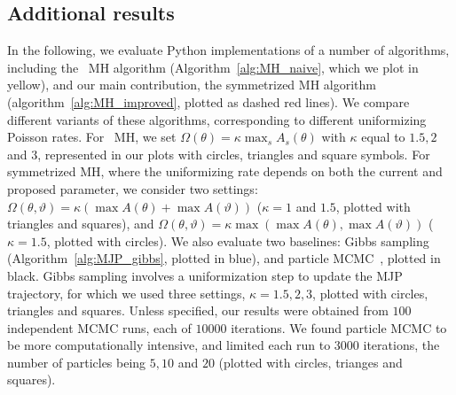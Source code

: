 \subsection{Additional results}
In the following, we evaluate Python implementations of a number of algorithms, including the \naive\ MH algorithm (Algorithm~\ref{alg:MH_naive}, which we plot in yellow), and our main contribution, the symmetrized MH algorithm (algorithm~\ref{alg:MH_improved}, plotted as dashed red lines). 
We compare different variants of these algorithms, corresponding to different uniformizing Poisson rates. %
For \naive\ MH, we set $\Omega(\theta) = \kappa \max_s A_s(\theta) $ with $\kappa$  equal to $1.5, 2$ and $3$, represented in our plots with circles, triangles and square symbols. 
For symmetrized MH, where the uniformizing rate depends on both the current and proposed parameter, we consider two settings:
 $\Omega(\theta, \vartheta) = \kappa (\max A(\theta) + \max A(\vartheta))$ 
 ($\kappa = 1$ and $1.5$, plotted with {triangles} and {squares}), and 
$\Omega(\theta, \vartheta) = \kappa \max(\max A(\theta), \max A(\vartheta))$
($\kappa=1.5$, plotted with {circles}).  
We also evaluate two baselines: Gibbs sampling (Algorithm~\ref{alg:MJP_gibbs}, plotted in blue), and particle MCMC~\citep{Andrieu10}, plotted in black. 
Gibbs sampling involves a uniformization step to update the MJP trajectory, for which we used three settings, $\kappa=1.5,2,3$, plotted with circles, {triangles} and {squares}.  
Unless specified, our results were obtained from $100$ independent MCMC runs, each of $10000$ iterations.
We found particle MCMC to be more computationally intensive, and limited each run to $3000$ iterations, the number of particles being $5, 10$ and $20$ (plotted with circles, trianges and squares). 

